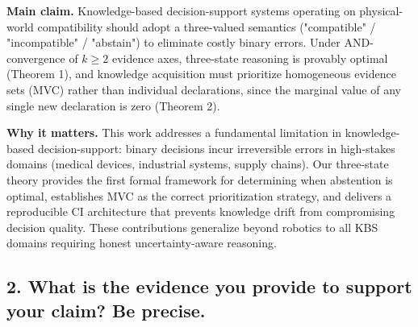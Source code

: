 \documentclass[11pt]{article}
\begin{document}
\noindent\textbf{Main claim.} Knowledge-based decision-support systems operating on physical-world compatibility should adopt a three-valued semantics ("compatible" / "incompatible" / "abstain") to eliminate costly binary errors. Under AND-convergence of $k \ge 2$ evidence axes, three-state reasoning is provably optimal (Theorem 1), and knowledge acquisition must prioritize homogeneous evidence sets (MVC) rather than individual declarations, since the marginal value of any single new declaration is zero (Theorem 2).

\vspace{0.5em}

\noindent\textbf{Why it matters.} This work addresses a fundamental limitation in knowledge-based decision-support: binary decisions incur irreversible errors in high-stakes domains (medical devices, industrial systems, supply chains). Our three-state theory provides the first formal framework for determining when abstention is optimal, establishes MVC as the correct prioritization strategy, and delivers a reproducible CI architecture that prevents knowledge drift from compromising decision quality. These contributions generalize beyond robotics to all KBS domains requiring honest uncertainty-aware reasoning.

\subsection*{2. What is the evidence you provide to support your claim? Be precise.}
\end{document}
